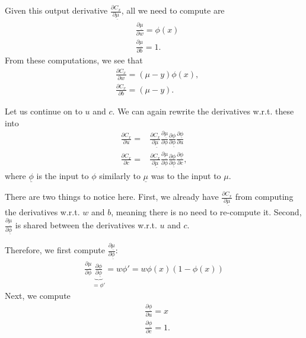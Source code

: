 \documentclass{report}
\begin{document}
Given this output derivative $\frac{\partial C_x}{\partial \underline{\mu}}$, all we need to
compute are
\begin{align*}
    &\frac{\partial \underline{\mu}}{\partial w} = \phi(x) \\
    &\frac{\partial \underline{\mu}}{\partial b} = 1.
\end{align*}
From these computations, we see that
\begin{align}
    \label{eq:c_w}
    &\frac{\partial C_x}{\partial w} = (\mu - y) \phi(x), \\
    \label{eq:c_b}
    &\frac{\partial C_x}{\partial b} = (\mu - y).
\end{align}

Let us continue on to $u$ and $c$. We can again rewrite the derivatives w.r.t.
these into
\begin{align*}
    \frac{\partial C_x}{\partial u} =& \frac{\partial C_x}{\partial
    \underline{\mu}}
    \frac{\partial \underline{\mu}}{\partial \phi}
    \frac{\partial \phi}{\partial \underline{\phi}}
    \frac{\partial \underline{\phi}}{\partial u} \\
    \frac{\partial C_x}{\partial c} =& \frac{\partial C_x}{\partial
    \underline{\mu}}
    \frac{\partial \underline{\mu}}{\partial \phi}
    \frac{\partial \phi}{\partial \underline{\phi}}
    \frac{\partial \underline{\phi}}{\partial c},
\end{align*}
where $\underline{\phi}$ is the input to $\phi$ similarly to $\underline{\mu}$
was to the input to $\mu$.

There are two things to notice here. First, we already have $\frac{\partial
C_x}{\partial \underline{\mu}}$ from computing the derivatives w.r.t. $w$ and
$b$, meaning there is no need to re-compute it. Second, $\frac{\partial
\underline{\mu}}{\partial \underline{\phi}}$ is shared between the derivatives
w.r.t. $u$ and $c$.

Therefore, we first compute $\frac{\partial \underline{\mu}}{\partial
\underline{\phi}}$:
\begin{align*}
    \frac{\partial \underline{\mu}}{\partial \phi}\underbrace{\frac{\partial \phi}{\partial
    \underline{\phi}}}_{=\phi'} = w \phi' = w \phi(x) (1- \phi(x))
\end{align*}
Next, we compute 
\begin{align*}
    &\frac{\partial \underline{\phi}}{\partial u} = x \\
    &\frac{\partial \underline{\phi}}{\partial c} = 1.
\end{align*}
\end{document}
